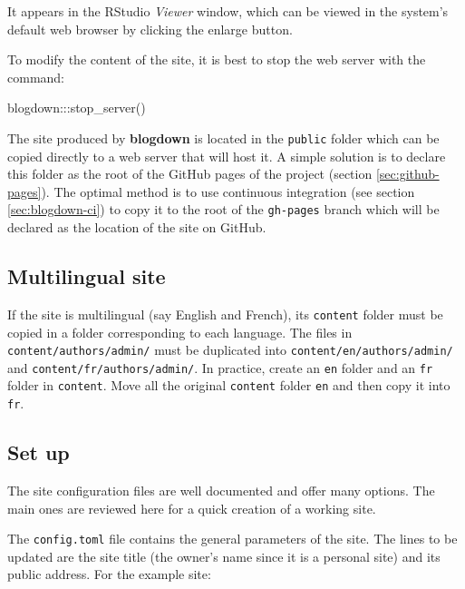 \documentclass[
  12pt,
  american,
  a4paper,
  extrafontsizes,onecolumn,openright
  ]{memoir}
\newenvironment{Shaded}{\begin{snugshade}}{\end{snugshade}}
\newcommand{\FunctionTok}[1]{\textcolor[rgb]{0.00,0.00,0.00}{#1}}
\newcommand{\NormalTok}[1]{#1}
\newcommand{\SpecialCharTok}[1]{\textcolor[rgb]{0.00,0.00,0.00}{#1}}
\begin{document}
It appears in the RStudio \emph{Viewer} window, which can be viewed in the system's default web browser by clicking the enlarge button.

To modify the content of the site, it is best to stop the web server with the command:

\scriptsize

\begin{Shaded}
\begin{Highlighting}[]
\NormalTok{blogdown}\SpecialCharTok{:::}\FunctionTok{stop\_server}\NormalTok{()}
\end{Highlighting}
\end{Shaded}

\normalsize

The site produced by \textbf{blogdown} is located in the \texttt{public} folder which can be copied directly to a web server that will host it.
A simple solution is to declare this folder as the root of the GitHub pages of the project
(section \ref{sec:github-pages}).
The optimal method is to use continuous integration (see section \ref{sec:blogdown-ci}) to copy it to the root of the \texttt{gh-pages} branch which will be declared as the location of the site on GitHub.

\hypertarget{multilingual-site}{%
\subsection{Multilingual site}\label{multilingual-site}}

If the site is multilingual (say English and French), its \texttt{content} folder must be copied in a folder corresponding to each language.
The files in \texttt{content/authors/admin/} must be duplicated into \texttt{content/en/authors}\break\texttt{/admin/} and \texttt{content/fr/authors/admin/}.
In practice, create an \texttt{en} folder and an \texttt{fr} folder in \texttt{content}.
Move all the original \texttt{content} folder \texttt{en} and then copy it into \texttt{fr}.

\hypertarget{set-up}{%
\subsection{Set up}\label{set-up}}

The site configuration files are well documented and offer many options.
The main ones are reviewed here for a quick creation of a working site.

The \texttt{config.toml} file contains the general parameters of the site.
The lines to be updated are the site title (the owner's name since it is a personal site) and its public address.
For the example site:
\end{document}
